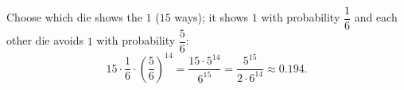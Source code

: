 Choose which die shows the $1$ ($15$ ways); it shows $1$ with probability $\dfrac{1}{6}$ and each other die avoids $1$ with probability $\dfrac{5}{6}$:
\[15\cdot\dfrac{1}{6}\cdot\left(\dfrac{5}{6}\right)^{14}=\dfrac{15\cdot5^{14}}{6^{15}}=\boxed{\dfrac{5^{15}}{2\cdot6^{14}}}\approx0.194.\]
